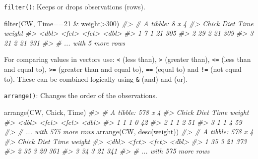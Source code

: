 \documentclass[
  14pt,
]{memoir}
\newenvironment{Shaded}{\begin{snugshade}}{\end{snugshade}}
\newcommand{\CommentTok}[1]{\textcolor[rgb]{0.56,0.35,0.01}{\textit{#1}}}
\newcommand{\DecValTok}[1]{\textcolor[rgb]{0.00,0.00,0.81}{#1}}
\newcommand{\FunctionTok}[1]{\textcolor[rgb]{0.00,0.00,0.00}{#1}}
\newcommand{\NormalTok}[1]{#1}
\newcommand{\SpecialCharTok}[1]{\textcolor[rgb]{0.00,0.00,0.00}{#1}}
\begin{document}
\texttt{filter()}: Keeps or drops observations (rows).

\begin{Shaded}
\begin{Highlighting}[]
\FunctionTok{filter}\NormalTok{(CW, Time}\SpecialCharTok{==}\DecValTok{21} \SpecialCharTok{\&}\NormalTok{ weight}\SpecialCharTok{\textgreater{}}\DecValTok{300}\NormalTok{)}
\CommentTok{\#\textgreater{} \# A tibble: 8 x 4}
\CommentTok{\#\textgreater{}   Chick Diet  Time  weight}
\CommentTok{\#\textgreater{}   \textless{}dbl\textgreater{} \textless{}fct\textgreater{} \textless{}fct\textgreater{}  \textless{}dbl\textgreater{}}
\CommentTok{\#\textgreater{} 1     7 1     21       305}
\CommentTok{\#\textgreater{} 2    29 2     21       309}
\CommentTok{\#\textgreater{} 3    21 2     21       331}
\CommentTok{\#\textgreater{} \# ... with 5 more rows}
\end{Highlighting}
\end{Shaded}

For comparing values in vectors use: \texttt{\textless{}} (less than), \texttt{\textgreater{}} (greater than), \texttt{\textless{}=}
(less than and equal to), \texttt{\textgreater{}=} (greater than and equal to), \texttt{==} (equal to) and \texttt{!=}
(not equal to). These can be combined logically using \texttt{\&} (and) and \texttt{\textbar{}} (or).

\hfill\break

\texttt{arrange()}: Changes the order of the observations.

\begin{Shaded}
\begin{Highlighting}[]
\FunctionTok{arrange}\NormalTok{(CW, Chick, Time)}
\CommentTok{\#\textgreater{} \# A tibble: 578 x 4}
\CommentTok{\#\textgreater{}   Chick Diet  Time  weight}
\CommentTok{\#\textgreater{}   \textless{}dbl\textgreater{} \textless{}fct\textgreater{} \textless{}fct\textgreater{}  \textless{}dbl\textgreater{}}
\CommentTok{\#\textgreater{} 1     1 1     0         42}
\CommentTok{\#\textgreater{} 2     1 1     2         51}
\CommentTok{\#\textgreater{} 3     1 1     4         59}
\CommentTok{\#\textgreater{} \# ... with 575 more rows}
\FunctionTok{arrange}\NormalTok{(CW, }\FunctionTok{desc}\NormalTok{(weight))}
\CommentTok{\#\textgreater{} \# A tibble: 578 x 4}
\CommentTok{\#\textgreater{}   Chick Diet  Time  weight}
\CommentTok{\#\textgreater{}   \textless{}dbl\textgreater{} \textless{}fct\textgreater{} \textless{}fct\textgreater{}  \textless{}dbl\textgreater{}}
\CommentTok{\#\textgreater{} 1    35 3     21       373}
\CommentTok{\#\textgreater{} 2    35 3     20       361}
\CommentTok{\#\textgreater{} 3    34 3     21       341}
\CommentTok{\#\textgreater{} \# ... with 575 more rows}
\end{Highlighting}
\end{Shaded}
\end{document}
